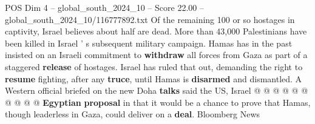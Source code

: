 \begin{textsample}{POS Dim 4 – global\_south\_2024\_10 – Score 22.00 – global\_south\_2024\_10/116777892.txt}
Of the remaining 100 or so hostages in captivity, Israel believes about half are dead.
More than 43,000 Palestinians have been killed in Israel ' s subsequent military campaign.
Hamas has in the past insisted on an Israeli commitment to \textbf{withdraw} all forces from Gaza as part of a staggered \textbf{release} of hostages.
Israel has ruled that out, demanding the right to \textbf{resume} fighting, after any \textbf{truce}, until Hamas is \textbf{disarmed} and dismantled.
A Western official briefed on the new Doha \textbf{talks} said the US, Israel @ @ @ @ @ @ @ @ @ @ \textbf{Egyptian} \textbf{proposal} in that it would be a chance to prove that Hamas, though leaderless in Gaza, could deliver on a \textbf{deal}.
Bloomberg News

\end{textsample}
